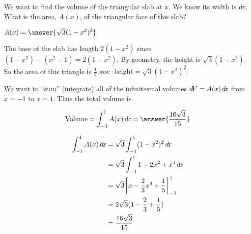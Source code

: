 \documentclass{ximera}
\begin{document}
\begin{example}
\begin{explanation}

We want to find the volume of the triangular slab at $x$. We know its width is $\mathop{}\!d\! x$.  What is the area,  $A(x)$, of the triangular face of this slab?

\begin{question}
	$A(x) = \answer{\sqrt{3}(1-x^2)^2}$
	
	\begin{hint}
		The base of the slab has length $2(1-x^2)$ since $(1-x^2)- (x^2-1) = 2(1-x^2)$. By geometry, the height is $\sqrt{3}(1-x^2)$.  So the area of this triangle is $\frac{1}{2} \textrm{base} \cdot \textrm{height} = \sqrt{3}(1-x^2)^2$.
	\end{hint}	
\end{question}


We want to ``sum'' (integrate) all of the infinitesmal volumes $\mathop{}\!d\! V = A(x) \mathop{}\!d\! x$ from $x=-1$ to $x=1$.
Thus the total volume is

\begin{question}
\[
\textrm{Volume} = \int_{-1}^1 A(x) \d x=\answer{\frac{16\sqrt{3}}{15}}
\]

\begin{hint}
	\begin{align*}
	\int_{-1}^1 A(x) \mathop{}\!d\! x  &= \sqrt{3} \int_{-1}^1 (1-x^2)^2 \mathop{}\!d\! x\\
		&=\sqrt{3} \int_{-1}^1 1-2x^2+x^4 \mathop{}\!d\! x \\
		&=\sqrt{3} \bigg[ x-\frac{2}{3}x^3+\frac{1}{5} \bigg]_{-1}^1\\
		&=2\sqrt{3}(1-\frac{2}{3}+\frac{1}{5})\\
		&=\frac{16\sqrt{3}}{15} 
	\end{align*}
\end{hint}

\end{question}


\end{explanation}
\end{example}
\end{document}
